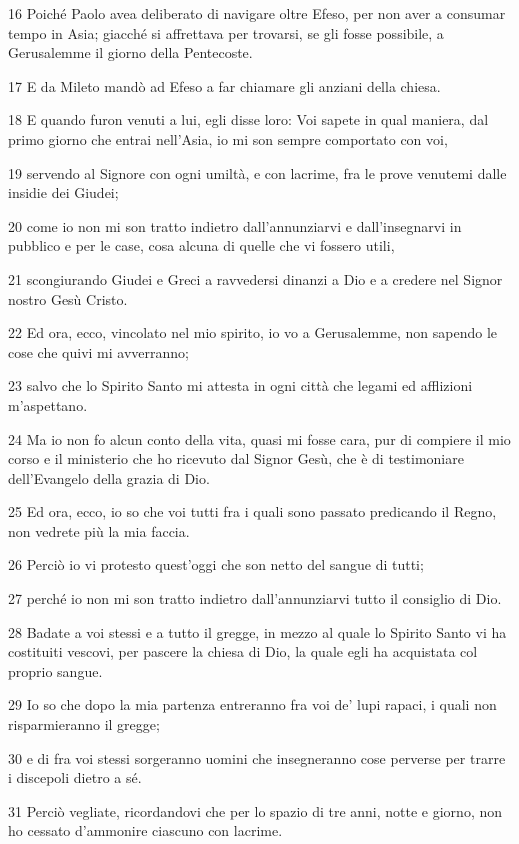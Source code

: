 \par 16 Poiché Paolo avea deliberato di navigare oltre Efeso, per non aver a consumar tempo in Asia; giacché si affrettava per trovarsi, se gli fosse possibile, a Gerusalemme il giorno della Pentecoste.
\par 17 E da Mileto mandò ad Efeso a far chiamare gli anziani della chiesa.
\par 18 E quando furon venuti a lui, egli disse loro: Voi sapete in qual maniera, dal primo giorno che entrai nell'Asia, io mi son sempre comportato con voi,
\par 19 servendo al Signore con ogni umiltà, e con lacrime, fra le prove venutemi dalle insidie dei Giudei;
\par 20 come io non mi son tratto indietro dall'annunziarvi e dall'insegnarvi in pubblico e per le case, cosa alcuna di quelle che vi fossero utili,
\par 21 scongiurando Giudei e Greci a ravvedersi dinanzi a Dio e a credere nel Signor nostro Gesù Cristo.
\par 22 Ed ora, ecco, vincolato nel mio spirito, io vo a Gerusalemme, non sapendo le cose che quivi mi avverranno;
\par 23 salvo che lo Spirito Santo mi attesta in ogni città che legami ed afflizioni m'aspettano.
\par 24 Ma io non fo alcun conto della vita, quasi mi fosse cara, pur di compiere il mio corso e il ministerio che ho ricevuto dal Signor Gesù, che è di testimoniare dell'Evangelo della grazia di Dio.
\par 25 Ed ora, ecco, io so che voi tutti fra i quali sono passato predicando il Regno, non vedrete più la mia faccia.
\par 26 Perciò io vi protesto quest'oggi che son netto del sangue di tutti;
\par 27 perché io non mi son tratto indietro dall'annunziarvi tutto il consiglio di Dio.
\par 28 Badate a voi stessi e a tutto il gregge, in mezzo al quale lo Spirito Santo vi ha costituiti vescovi, per pascere la chiesa di Dio, la quale egli ha acquistata col proprio sangue.
\par 29 Io so che dopo la mia partenza entreranno fra voi de' lupi rapaci, i quali non risparmieranno il gregge;
\par 30 e di fra voi stessi sorgeranno uomini che insegneranno cose perverse per trarre i discepoli dietro a sé.
\par 31 Perciò vegliate, ricordandovi che per lo spazio di tre anni, notte e giorno, non ho cessato d'ammonire ciascuno con lacrime.
